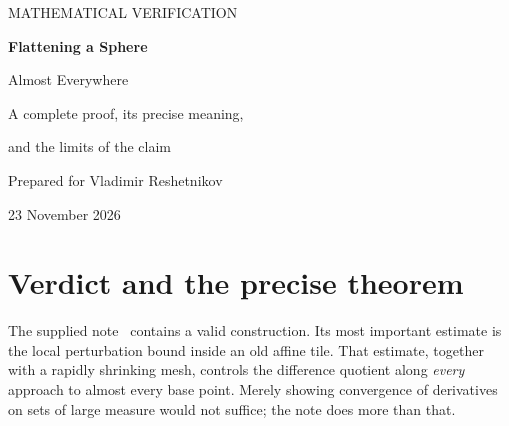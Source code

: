 \documentclass[11pt,letterpaper]{article}
\numberwithin{equation}{section}
\theoremstyle{remark}
\begin{document}
\begin{center}
{\color{teal}\small MATHEMATICAL VERIFICATION}\par\vspace{0.6em}
{\color{ink}\LARGE\bfseries Flattening a Sphere\par Almost Everywhere}\par\vspace{0.65em}
{\large A complete proof, its precise meaning,\par and the limits of the claim}\par\vspace{0.8em}
Prepared for Vladimir Reshetnikov\par
23 November 2026
\end{center}

\begin{abstract}
The main existence claim in the supplied document is correct. A sphere with a closed meridian removed admits a homeomorphism to a planar domain whose classical differential is an isometry at almost every spherical point. The map can be uniformly close to the sinusoidal projection, with arbitrarily small positive excess area. The refinement estimates in the document do prove classical, not merely approximate, differentiability. This report supplies a complete proof, simplifies the construction to one mesh size per stage, repairs a minor parameter-range issue, and expands the measure-theoretic steps. It also establishes sharper consequences: the map is not locally Lipschitz on any open patch; the exceptional image has positive area in every planar open set; and the particular construction has explicit positive excess area. The result preserves first-order geometry almost everywhere, but does not preserve all finite distances, curve lengths, or areas. A separate application of an existing theorem gives zero excess area under approximate differentiability; the corresponding classical question is not settled here. No claim of historical novelty is certified.
\end{abstract}

\tableofcontents
\newpage

\section{Verdict and the precise theorem}
\label{sec:verdict}

The supplied note~\cite{source} contains a valid construction. Its most important estimate is the local perturbation bound inside an old affine tile. That estimate, together with a rapidly shrinking mesh, controls the difference quotient along \emph{every} approach to almost every base point. Merely showing convergence of derivatives on sets of large measure would not suffice; the note does more than that.
\end{document}
